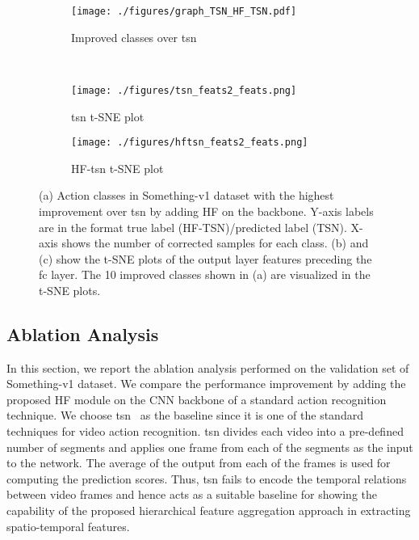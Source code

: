 \documentclass[journal,onecolumn]{IEEEtran}
\begin{document}
\begin{figure}[t]
	\centering
		\begin{subfigure}[b]{1\textwidth}
			\hspace{2cm}
		\texttt{[image: ./figures/graph\_TSN\_HF\_TSN.pdf]}
		\caption{Improved classes over \ac{tsn}}
		\label{fig:classes_imp}
	\end{subfigure} \\ \vspace*{.5cm}
	\begin{subfigure}[b]{0.35\textwidth}
		\texttt{[image: ./figures/tsn\_feats2\_feats.png]}
		\caption{\ac{tsn} t-SNE plot}
		\label{fig:tsn_tsne}
	\end{subfigure} \hspace{3cm}
	\begin{subfigure}[b]{0.35\textwidth}
		\texttt{[image: ./figures/hftsn\_feats2\_feats.png]}
		\caption{HF-\ac{tsn} t-SNE plot}
		\label{fig:hftsn_tsne}
	\end{subfigure}
\caption{(a) Action classes in Something-v1 dataset with the highest improvement over \ac{tsn} by adding HF on the backbone. Y-axis labels are in the format true label (HF-TSN)/predicted label (TSN). X-axis shows the number of corrected samples for each class. (b) and (c) show the t-SNE plots of the output layer features preceding the \ac{fc} layer. The 10 improved classes shown in (a) are visualized in the t-SNE plots.}\label{fig:tsne_plots}

\end{figure}


\subsection{Ablation Analysis}
\label{sec:ablation}


In this section, we report the ablation analysis performed on the validation set of Something-v1 dataset. We compare the performance improvement by adding the proposed HF module on the CNN backbone of a standard action recognition technique. We choose \ac{tsn}~\cite{tsn} as the baseline since it is one of the standard techniques for video action recognition. \ac{tsn} divides each video into a pre-defined number of segments and applies one frame from each of the segments as the input to the network. The average of the output from each of the frames is used for computing the prediction scores. Thus, \ac{tsn} fails to encode the temporal relations between video frames and hence acts as a suitable baseline for showing the capability of the proposed hierarchical feature aggregation approach in extracting spatio-temporal features. 
\end{document}
